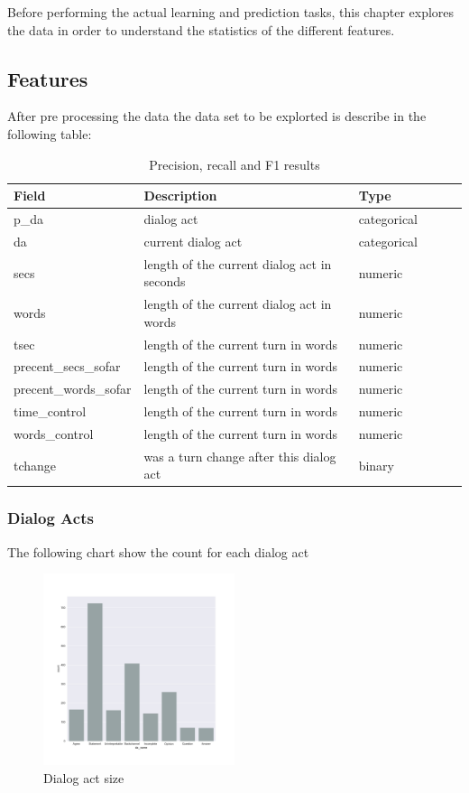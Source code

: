 Before performing the actual learning and prediction tasks, this chapter explores the data
in order to understand the statistics of the different features.

\subsection{Features}

After pre processing the data the data set to be explorted is describe in the following table:

\begin{table}[ht!]
\begin{center}
\begin{tabular}{llllrr}
\toprule
Field &  Description & Type &\\
\midrule
     p\_da & dialog act & categorical\\
     da & current dialog act & categorical \\
     secs & length of the current dialog act in seconds & numeric \\
     words & length of the current dialog act in words & numeric \\
     tsec & length of the current turn in words & numeric \\
     precent\_secs\_sofar  & length of the current turn in words & numeric \\
     precent\_words\_sofar & length of the current turn in words & numeric \\
     time\_control & length of the current turn in words & numeric \\
     words\_control & length of the current turn in words & numeric \\
     tchange & was a turn change after this dialog act & binary \\
\bottomrule
\end{tabular}
\end{center}
\caption{Precision, recall and F1 results }
\end{table}


\subsubsection{Dialog Acts}

The following chart show the count for each dialog act

 \begin{figure}
 \centering
 \includegraphics[width=0.5\textwidth]{../scikitlearn/figures/countplot_da_name_count.pdf}
 \caption{Dialog act size\label{overflow}}
 \end{figure}

